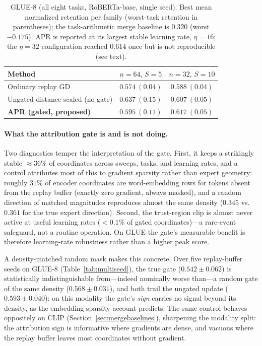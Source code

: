 \documentclass[11pt]{article}
\begin{document}
\begin{table}[t]
\centering
\caption{GLUE-8 (all eight tasks, RoBERTa-base, single seed). Best mean normalized retention per family (worst-task retention in parentheses); the task-arithmetic merge baseline is $0.320$ (worst $-0.175$). APR is reported at its largest stable learning rate, $\eta=16$; the $\eta=32$ configuration reached $0.614$ once but is not reproducible (see text).}
\label{tab:glue8}
\begin{tabular}{lcc}
\toprule
Method & $n{=}64,\,S{=}5$ & $n{=}32,\,S{=}10$ \\
\midrule
Ordinary replay GD & $0.574\ (0.04)$ & $0.588\ (0.04)$ \\
Ungated distance-scaled (no gate) & $\mathbf{0.637}\ (0.15)$ & $0.607\ (0.05)$ \\
\textbf{APR (gated, proposed)} & $0.595\ (0.11)$ & $\mathbf{0.617}\ (0.05)$ \\
\bottomrule
\end{tabular}
\end{table}

\paragraph{What the attribution gate is and is not doing.}
Two diagnostics temper the interpretation of the gate. First, it keeps a strikingly stable $\approx 36\%$ of coordinates across sweeps, tasks, and learning rates, and a control attributes most of this to gradient sparsity rather than expert geometry: roughly $31\%$ of encoder coordinates are word-embedding rows for tokens absent from the replay buffer (exactly zero gradient, always masked), and a random direction of matched magnitudes reproduces almost the same density ($0.345$ vs.\ $0.361$ for the true expert direction). Second, the trust-region clip is almost never active at useful learning rates ($<0.1\%$ of gated coordinates)---a rare-event safeguard, not a routine operation. On GLUE the gate's measurable benefit is therefore learning-rate robustness rather than a higher peak score.

A density-matched random mask makes this concrete. Over five replay-buffer seeds on GLUE-8 (Table~\ref{tab:multiseed}), the true gate ($0.542\pm0.062$) is statistically indistinguishable from---indeed nominally worse than---a random gate of the same density ($0.568\pm0.031$), and both trail the ungated update ($0.593\pm0.040$): on this modality the gate's \emph{sign} carries no signal beyond its density, as the embedding-sparsity account predicts. The same control behaves oppositely on CLIP (Section~\ref{sec:mergebaselines}), sharpening the modality split: the attribution sign is informative where gradients are dense, and vacuous where the replay buffer leaves most coordinates without gradient.
\end{document}
